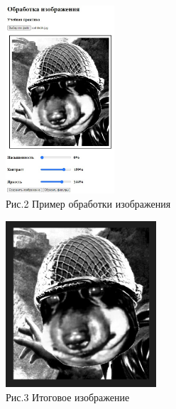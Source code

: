 \documentclass[12pt,a4paper]{scrartcl}
\begin{document}
\begin{figure}
  \begin{center}
    \includegraphics[width=0.36\textwidth]{primer1.jpg}
  \end{center}
  \caption{Рис.2  Пример обработки изображения}\label{fig:ex}
\end{figure}

\begin{figure}
  \begin{center}
    \includegraphics[width=0.5\textwidth]{primer2.jpg}
  \end{center}
  \caption{Рис.3  Итоговое изображение}\label{fig:ex}
\end{figure}
\end{document}
